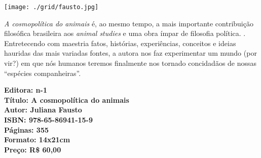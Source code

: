 \pagebreak


\begin{center}
\hspace*{-3.6cm}
\hspace*{3.1cm}\texttt{[image: ./grid/fausto.jpg]}
\end{center}

\hspace*{-7cm}\hrulefill\hspace*{-7cm}

\medskip

\noindent{}\textit{A cosmopolítica do animais} é, ao mesmo tempo, a mais importante contribuição filosófica brasileira aos \textit{animal studies} e uma obra ímpar de filosofia política. . Entretecendo com maestria fatos, histórias, experiências, conceitos e ideias hauridas das mais variadas fontes, a autora nos faz experimentar um mundo (por vir?) em que nós humanos teremos finalmente nos tornado concidadãos de nossas “espécies companheiras”.

\vfill

\hspace*{-.4cm}\begin{minipage}[c]{.5\linewidth}
\small\textbf{
\hspace*{-.1cm}Editora: n-1\\
Título: A cosmopolítica do animais\\
Autor: Juliana Fausto\\ 
ISBN: 978-65-86941-15-9\\
Páginas: 355\\
Formato: 14x21cm\\
Preço: R\$ 60,00\\
}
\end{minipage}

\pagebreak

\vspace*{1.5cm}


\bigskip

\hfill{}\scalebox{.8}{JULIANA FAUSTO}

\bigskip
\bigskip
\bigskip

